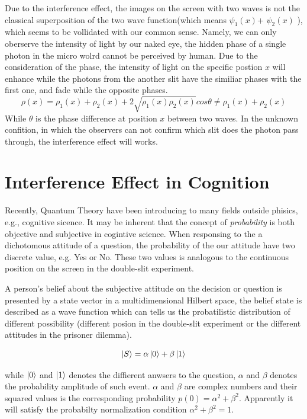 \documentclass[11pt,notitlepage]{article}
\begin{document}
Due to the interference effect, the images on the screen with two waves is not the classical superposition of the two wave function(which means  $\psi_1(x)$+ $\psi_2(x)$ ), which seems to be vollidated with our common sense. Namely, we can only oberserve the intensity of light by our naked eye, the hidden phase of a single photon in the micro wolrd cannot be perceived by human. Due to the consideration of the phase, the intensity of light on the specific postion $x$ will enhance while the photons from the another slit have the similiar phases with the first one, and fade while the opposite phases.   
\begin{equation}
\rho(x)=\rho_1(x)+\rho_2(x)+2\sqrt{\rho_1(x)\rho_2(x)}cos\theta \neq \rho_1(x)+\rho_2(x)
\label{eq:wave_function}
\end{equation}
While $\theta$ is the phase difference at position $x$ between two waves. In the unknown confition, in which the observers can not confirm which slit does the photon pass through, the interference effect will works.

\section{Interference Effect in Cognition}

Recently, Quantum Theory have been introducing to many fields outside phisics, e.g., cognitive sicence. It may be inherent that the concept of {\em{probability}} is both objective and subjective in cogintive science. When responsing to the a dichotomous attitude of a question, the probability of the our attitude have two discrete value, e.g. Yes or No. These two values is analogous to the continuous position on the screen in the double-slit experiment.

A person's belief about the subjective attitude on the decision or question is presented by a state vector in a multidimensional Hilbert space, the belief state is described as a wave function which can tells us the probatilistic distribution of different possibility (different posion in the double-slit experiment or the different attitudes in the prisoner dilemma). 

\begin{equation}
\ket{S}=\alpha \ket{0}+ \beta \ket{1}
\label{eq:belief_state}
\end{equation}

while $\ket{0}$ and $\ket{1}$ denotes the diffierent anwsers to the question, $\alpha$ and $\beta$ denotes the probability amplitude of such event.  $\alpha$ and $\beta$ are complex numbers and their squared values is the corresponding probability $p(0)=\alpha^2+\beta^2$. Apparently it will satisfy the probabilty normalization condition $\alpha^2 +\beta^2 =1$.
\end{document}
